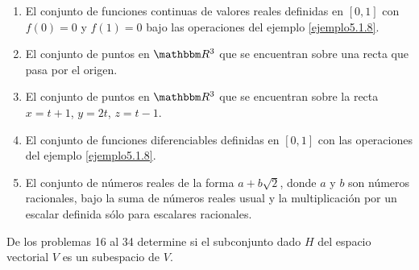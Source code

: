 \begin{enumerate}
    \item El conjunto de funciones continuas de valores reales definidas en $[0, 1]$ con $f(0) = 0$ y $f(1) = 0$ bajo las operaciones del ejemplo \ref{ejemplo5.1.8}.
    \item El conjunto de puntos en $\RR[3]$ que se encuentran sobre una recta que pasa por el origen.
    \item El conjunto de puntos en $\RR[3]$ que se encuentran sobre la recta $x = t+1$, $y = 2t$, $z = t-1$.
    \item El conjunto de funciones diferenciables definidas en $[0, 1]$ con las operaciones del ejemplo \ref{ejemplo5.1.8}.
    \item El conjunto de números reales de la forma $a+b \sqrt{2}$, donde $a$ y $b$ son números racionales, bajo la suma de números reales usual y la multiplicación por un escalar definida sólo para escalares racionales.
\end{enumerate}
De los problemas 16 al 34 determine si el subconjunto dado $H$ del espacio vectorial $V$ es un subespacio de $V$.
